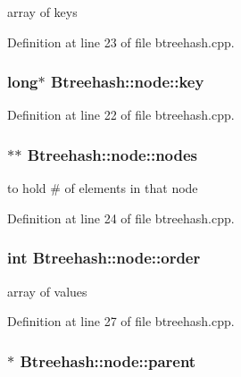 array of keys 



Definition at line 23 of file btreehash.\-cpp.

\hypertarget{class_btreehash_1_1node_a182c9bcbe6e1ff41356283ac57443a2d}{
\subsubsection[{key}]{\setlength{\rightskip}{0pt plus 5cm}long$\ast$ Btreehash\-::node\-::key}}\label{class_btreehash_1_1node_a182c9bcbe6e1ff41356283ac57443a2d}


Definition at line 22 of file btreehash.\-cpp.

\hypertarget{class_btreehash_1_1node_a0fe477a053d6f13eecbbf975cfca2707}{
\subsubsection[{nodes}]{$\ast$$\ast$ Btreehash\-::node\-::nodes}}\label{class_btreehash_1_1node_a0fe477a053d6f13eecbbf975cfca2707}


to hold \# of elements in that node 



Definition at line 24 of file btreehash.\-cpp.

\hypertarget{class_btreehash_1_1node_a6222a2bd19f802090d25f8ce8e5ea413}{
\subsubsection[{order}]{\setlength{\rightskip}{0pt plus 5cm}int Btreehash\-::node\-::order}}\label{class_btreehash_1_1node_a6222a2bd19f802090d25f8ce8e5ea413}


array of values 



Definition at line 27 of file btreehash.\-cpp.

\hypertarget{class_btreehash_1_1node_ae4f3ee150ef5664250371ef8c7287812}{
\subsubsection[{parent}]{$\ast$ Btreehash\-::node\-::parent}}\label{class_btreehash_1_1node_ae4f3ee150ef5664250371ef8c7287812}


